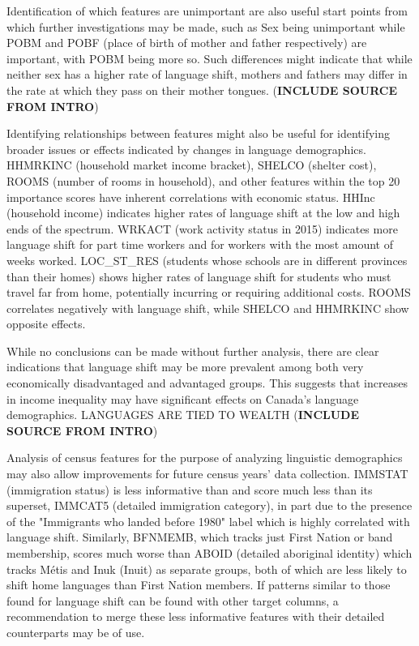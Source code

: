 \documentclass[10pt, conference, compsocconf]{IEEEtran}
\begin{document}
Identification of which features are unimportant are also useful start points from which further investigations may be made, such as Sex being unimportant while POBM and POBF (place of birth of mother and father respectively) are important, with POBM being more so.  Such differences might indicate that while neither sex has a higher rate of language shift, mothers and fathers may differ in the rate at which they pass on their mother tongues.  (\textbf{INCLUDE SOURCE FROM INTRO})

Identifying relationships between features might also be useful for identifying broader issues or effects indicated by changes in language demographics.  HHMRKINC (household market income bracket), SHELCO (shelter cost), ROOMS (number of rooms in household), and other features within the top 20 importance scores have inherent correlations with economic status.  HHInc (household income) indicates higher rates of language shift at the low and high ends of the spectrum.  WRKACT (work activity status in 2015) indicates more language shift for part time workers and for workers with the most amount of weeks worked.   LOC\_ST\_RES (students whose schools are in different provinces than their homes) shows higher rates of language shift for students who must travel far from home, potentially incurring or requiring additional costs.  ROOMS correlates negatively with language shift, while SHELCO and HHMRKINC show opposite effects.

While no conclusions can be made without further analysis, there are clear indications that language shift may be more prevalent among both very economically disadvantaged and advantaged groups.  This suggests that increases in income inequality may have significant effects on Canada's language demographics.  LANGUAGES ARE TIED TO WEALTH (\textbf{INCLUDE SOURCE FROM INTRO})

Analysis of census features for the purpose of analyzing linguistic demographics may also allow improvements for future census years' data collection.  IMMSTAT (immigration status) is less informative than and score much less than its superset, IMMCAT5 (detailed immigration category), in part due to the presence of the "Immigrants who landed before 1980" label which is highly correlated with language shift.  Similarly, BFNMEMB, which tracks just First Nation or band membership, scores much worse than ABOID (detailed aboriginal identity) which tracks Métis and Inuk (Inuit) as separate groups, both of which are less likely to shift home languages than First Nation members.  If patterns similar to those found for language shift can be found with other target columns, a recommendation to merge these less informative features with their detailed counterparts may be of use.
\end{document}
